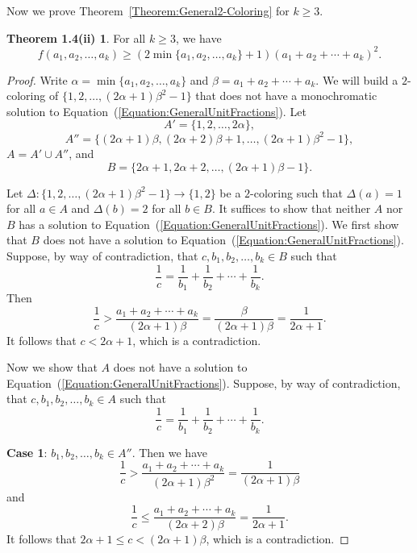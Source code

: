 \documentclass[11pt]{article}
\theoremstyle{definition}
\newtheorem*{thm1.4PartII}{Theorem 1.4(ii)}
\begin{document}
Now we prove Theorem~\ref{Theorem:General2-Coloring} for $k\geq3$.
\begin{thm1.4PartII}\label{Theorem:General2-Coloring_k=3}
For all $k\geq3$, we have
    \[
    f(a_1,a_2,\ldots,a_k)\geq(2\min\{a_1,a_2,\ldots,a_k\}+1)(a_1+a_2+\cdots+a_k)^2.
    \]    
\end{thm1.4PartII}

\begin{proof}
    Write $\alpha=\min\{a_1,a_2,\ldots,a_k\}$ and $\beta=a_1+a_2+\cdots+a_k$. We will build a $2$-coloring of $\{1,2,\ldots,(2\alpha+1)\beta^2-1\}$ that does not have a monochromatic solution to Equation~(\ref{Equation:GeneralUnitFractions}). Let \[A'=\{1,2,\ldots,2\alpha\},\]
    \[
    A''=\{(2\alpha+1)\beta,(2\alpha+2)\beta+1,\ldots,(2\alpha+1)\beta^2-1\},
    \]
    $A=A'\cup A''$, and
    \[
    B=\{2\alpha+1,2\alpha+2,\ldots,(2\alpha+1)\beta-1\}.
    \]
    
    Let $\Delta:\{1,2,\ldots,(2\alpha+1)\beta^2-1\}\to\{1,2\}$ be a $2$-coloring such that $\Delta(a)=1$ for all $a\in A$ and $\Delta(b)=2$ for all $b\in B$. It suffices to show that neither $A$ nor $B$ has a solution to Equation~(\ref{Equation:GeneralUnitFractions}). We first show that $B$ does not have a solution to Equation~(\ref{Equation:GeneralUnitFractions}). Suppose, by way of contradiction, that $c,b_1,b_2,\ldots,b_k\in B$ such that
    \[
    \frac{1}{c}=\frac{1}{b_1}+\frac{1}{b_2}+\cdots+\frac{1}{b_k}.
    \]
    Then
    \[
    \frac{1}{c}>\frac{a_1+a_2+\cdots+a_k}{(2\alpha+1)\beta}=\frac{\beta}{(2\alpha+1)\beta}=\frac{1}{2\alpha+1}.
    \]
    It follows that $c<2\alpha+1$, which is a contradiction. 

    Now we show that $A$ does not have a solution to Equation~(\ref{Equation:GeneralUnitFractions}). Suppose, by way of contradiction, that $c,b_1,b_2,\ldots,b_k\in A$ such that
    \[
    \frac{1}{c}=\frac{1}{b_1}+\frac{1}{b_2}+\cdots+\frac{1}{b_k}.
    \]

{\bf Case 1}: $b_1,b_2,\ldots,b_k\in A''$. Then we have
    \[
    \frac{1}{c}>\frac{a_1+a_2+\cdots+a_k}{(2\alpha+1)\beta^2}=\frac{1}{(2\alpha+1)\beta}
    \]
    and
    \[
    \frac{1}{c}\leq\frac{a_1+a_2+\cdots+a_k}{(2\alpha+2)\beta}=\frac{1}{2\alpha+1}.
    \]
    It follows that $2\alpha+1\leq c<(2\alpha+1)\beta$, which is a contradiction.


\end{proof}
\end{document}
